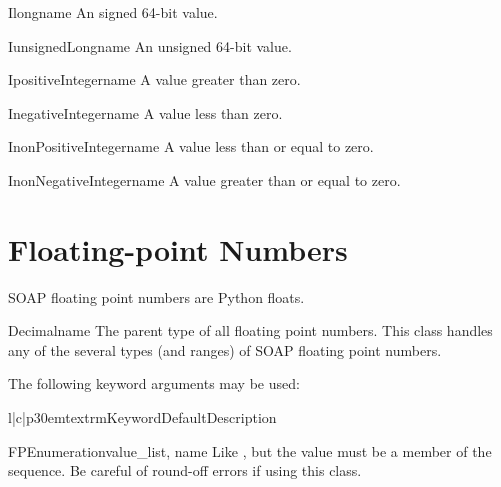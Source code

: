 \begin{classdesc}{Ilong}{name}
An signed 64-bit value.
\end{classdesc}

\begin{classdesc}{IunsignedLong}{name}
An unsigned 64-bit value.
\end{classdesc}

\begin{classdesc}{IpositiveInteger}{name}
A value greater than zero.
\end{classdesc}

\begin{classdesc}{InegativeInteger}{name}
A value less than zero.
\end{classdesc}

\begin{classdesc}{InonPositiveInteger}{name}
A value less than or equal to zero.
\end{classdesc}

\begin{classdesc}{InonNegativeInteger}{name}
A value greater than or equal to zero.
\end{classdesc}

\section{Floating-point Numbers}

SOAP floating point numbers are Python floats.

\begin{classdesc}{Decimal}{name}
The parent type of all floating point numbers.
This class handles any of the several types (and ranges) of SOAP
floating point numbers.

The following keyword arguments may be used:

\begin{tableiii}{l|c|p{30em}}{textrm}{Keyword}{Default}{Description}
\end{tableiii}
\end{classdesc}

\begin{classdesc}{FPEnumeration}{value_list, name}
Like , but the value must be a member of
the  sequence.
Be careful of round-off errors if using this class.
\end{classdesc}

